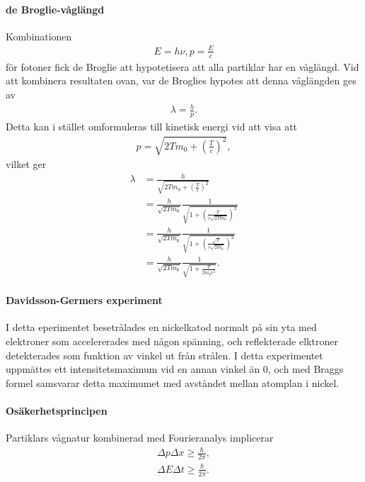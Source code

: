 \paragraph{de Broglie-våglängd}
Kombinationen
\begin{align*}
	E = h\nu, p = \frac{E}{c}
\end{align*}
för fotoner fick de Broglie att hypotetisera att alla partiklar har en våglängd. Vid att kombinera resultaten ovan, var de Broglies hypotes att denna våglängden ges av
\begin{align*}
	\lambda = \frac{h}{p}.
\end{align*}
Detta kan i stället omformuleras till kinetisk energi vid att visa att
\begin{align*}
	p = \sqrt{2Tm_{0} + \left(\frac{T}{c}\right)^{2}},
\end{align*}
vilket ger
\begin{align*}
	\lambda &= \frac{h}{\sqrt{2Tm_{0} + \left(\frac{T}{c}\right)^{2}}} \\
	        &= \frac{h}{\sqrt{2Tm_{0}}}\frac{1}{\sqrt{1 + \left(\frac{T}{c\sqrt{2Tm_{0}}}\right)^{2}}} \\
	        &= \frac{h}{\sqrt{2Tm_{0}}}\frac{1}{\sqrt{1 + \left(\frac{\sqrt{T}}{c\sqrt{2m_{0}}}\right)^{2}}} \\
	        &= \frac{h}{\sqrt{2Tm_{0}}}\frac{1}{\sqrt{1 + \frac{T}{2m_{0}c^{2}}}}.
\end{align*}

\paragraph{Davidsson-Germers experiment}
I detta eperimentet besetrålades en nickelkatod normalt på sin yta med elektroner som accelererades med någon spänning, och reflekterade elktroner detekterades som funktion av vinkel ut från strålen. I detta experimentet uppmättes ett intensitetsmaximum vid en annan vinkel än $0$, och med Braggs formel samsvarar detta maximumet med avståndet mellan atomplan i nickel.

\paragraph{Osäkerhetsprincipen}
Partiklars vågnatur kombinerad med Fourieranalys implicerar
\begin{align*}
	\Delta p \Delta x \geq \frac{\hbar}{2\pi}, \\
	\Delta E \Delta t \geq \frac{\hbar}{2\pi}.
\end{align*}
